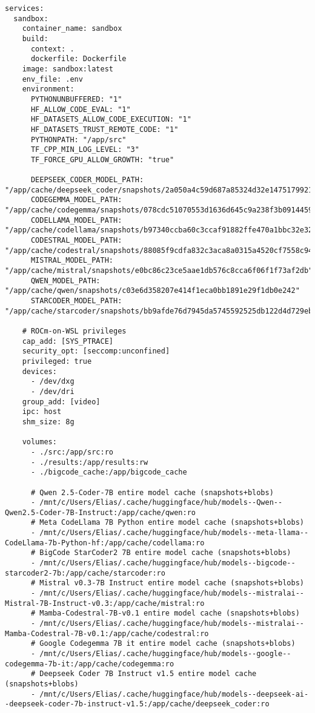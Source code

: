 \begin{verbatim}
services:
  sandbox:
    container_name: sandbox
    build:
      context: .
      dockerfile: Dockerfile  
    image: sandbox:latest
    env_file: .env
    environment:
      PYTHONUNBUFFERED: "1"
      HF_ALLOW_CODE_EVAL: "1"
      HF_DATASETS_ALLOW_CODE_EXECUTION: "1"
      HF_DATASETS_TRUST_REMOTE_CODE: "1" 
      PYTHONPATH: "/app/src"
      TF_CPP_MIN_LOG_LEVEL: "3"
      TF_FORCE_GPU_ALLOW_GROWTH: "true"
        
      DEEPSEEK_CODER_MODEL_PATH:          "/app/cache/deepseek_coder/snapshots/2a050a4c59d687a85324d32e147517992117ed30"
      CODEGEMMA_MODEL_PATH:               "/app/cache/codegemma/snapshots/078cdc51070553d1636d645c9a238f3b0914459a"
      CODELLAMA_MODEL_PATH:               "/app/cache/codellama/snapshots/b97340ccba60c3ccaf91882ffe470a1bbc32e32c"
      CODESTRAL_MODEL_PATH:               "/app/cache/codestral/snapshots/88085f9cdfa832c3aca8a0315a4520cf7558c947"
      MISTRAL_MODEL_PATH:                 "/app/cache/mistral/snapshots/e0bc86c23ce5aae1db576c8cca6f06f1f73af2db"
      QWEN_MODEL_PATH:                    "/app/cache/qwen/snapshots/c03e6d358207e414f1eca0bb1891e29f1db0e242"
      STARCODER_MODEL_PATH:               "/app/cache/starcoder/snapshots/bb9afde76d7945da5745592525db122d4d729eb1"

    # ROCm-on-WSL privileges
    cap_add: [SYS_PTRACE]
    security_opt: [seccomp:unconfined]
    privileged: true
    devices:
      - /dev/dxg
      - /dev/dri
    group_add: [video]
    ipc: host
    shm_size: 8g

    volumes:
      - ./src:/app/src:ro
      - ./results:/app/results:rw
      - ./bigcode_cache:/app/bigcode_cache

      # Qwen 2.5-Coder-7B entire model cache (snapshots+blobs)
      - /mnt/c/Users/Elias/.cache/huggingface/hub/models--Qwen--Qwen2.5-Coder-7B-Instruct:/app/cache/qwen:ro
      # Meta CodeLlama 7B Python entire model cache (snapshots+blobs)
      - /mnt/c/Users/Elias/.cache/huggingface/hub/models--meta-llama--CodeLlama-7b-Python-hf:/app/cache/codellama:ro
      # BigCode StarCoder2 7B entire model cache (snapshots+blobs)
      - /mnt/c/Users/Elias/.cache/huggingface/hub/models--bigcode--starcoder2-7b:/app/cache/starcoder:ro
      # Mistral v0.3-7B Instruct entire model cache (snapshots+blobs) 
      - /mnt/c/Users/Elias/.cache/huggingface/hub/models--mistralai--Mistral-7B-Instruct-v0.3:/app/cache/mistral:ro
      # Mamba-Codestral-7B-v0.1 entire model cache (snapshots+blobs) 
      - /mnt/c/Users/Elias/.cache/huggingface/hub/models--mistralai--Mamba-Codestral-7B-v0.1:/app/cache/codestral:ro
      # Google Codegemma 7B it entire model cache (snapshots+blobs) 
      - /mnt/c/Users/Elias/.cache/huggingface/hub/models--google--codegemma-7b-it:/app/cache/codegemma:ro
      # Deepseek Coder 7B Instruct v1.5 entire model cache (snapshots+blobs) 
      - /mnt/c/Users/Elias/.cache/huggingface/hub/models--deepseek-ai--deepseek-coder-7b-instruct-v1.5:/app/cache/deepseek_coder:ro


\end{verbatim}
